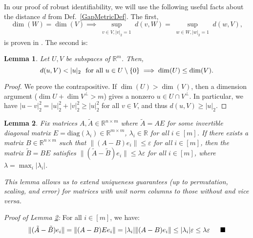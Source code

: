\documentclass[journal, onecolumn]{IEEEtran}
\newtheorem{lemma}{Lemma}
\begin{document}
In our proof of robust identifiability, we will use the following useful facts about the distance $d$ from Def.~\ref{GapMetricDef}. The first, 
\begin{equation}\label{SubspaceMetricSameDim}
\dim(W) = \dim(V) \implies \sup_{\substack{v \in V, |v|_2 = 1}}  d(v,W)  = \sup_{\substack{w \in W, |w|_2 = 1}} d(w,V),
\end{equation}
is proven in \cite[Lemma 3.3]{Morris10}. The second is:
\begin{lemma}\label{MinDimLemma}
Let $U, V$ be subspaces of $\mathbb{R}^{m}$. Then,
\begin{equation}\label{MinDim}
d(u,V) < |u|_2 \ \ \text{\rm for all } u \in U \setminus{\{0\}} \implies \dim(U) \leq \dim(V).
\end{equation}
\end{lemma}

\begin{proof}
We prove the contrapositive.  If $\dim(U) > \dim(V)$, then a dimension argument ($\dim U + \dim V^\perp > m$) gives a nonzero $u \in U \cap V^\perp$.  In particular, we have $|u - v|_2^2 = |u|_2^2 + |v|_2^2 \geq |u|_2^2$ for all $v \in V$, and thus $d(u,V) \geq |u|_2$.
\end{proof}

\begin{lemma}\label{NormalizedDictionaryLemma}
Fix matrices $A, \tilde{A} \in \mathbb{R}^{n \times m}$ where $\tilde{A} = AE$ for some invertible diagonal matrix $E = \text{diag}(\lambda_i) \in \mathbb{R}^{m \times m}$, $\lambda_i \in \mathbb{R}$ for all $i \in [m]$. If there exists a matrix $B \in \mathbb{R}^{n \times m}$ such that $\|(A - B)e_i\| \leq \varepsilon$ for all $i \in [m]$, then the matrix $\tilde{B} = BE$ satisfies $\|(\tilde{A} - \tilde{B})e_i\| \leq \lambda \varepsilon$ for all $i \in [m]$, where $\lambda = \max_i |\lambda_i|$.

This lemma allows us to extend uniqueness guarantees (up to permutation, scaling, and error) for matrices with unit norm columns to those without and vice versa. 
\end{lemma}

\emph{Proof of Lemma \ref{NormalizedDictionaryLemma}:} For all $i \in [m]$, we have:
\begin{align*}
\|(\tilde{A} - \tilde{B})e_i\| = \|(A-B)Ee_i\| = |\lambda_i| \|(A-B)e_i\| \leq |\lambda_i| \varepsilon \leq \lambda \varepsilon 
\indent \blacksquare
\end{align*}
\end{document}
